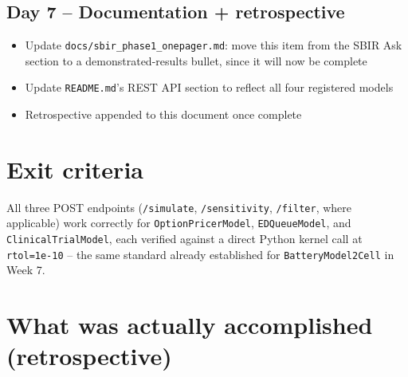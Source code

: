 \documentclass[11pt]{article}
\begin{document}
\subsection*{Day 7 -- Documentation + retrospective}
\begin{itemize}[leftmargin=*]
  \item Update \texttt{docs/sbir\_phase1\_onepager.md}: move this item
    from the SBIR Ask section to a demonstrated-results bullet, since
    it will now be complete
  \item Update \texttt{README.md}'s REST API section to reflect all
    four registered models
  \item Retrospective appended to this document once complete
\end{itemize}

\section*{Exit criteria}
All three POST endpoints (\texttt{/simulate}, \texttt{/sensitivity},
\texttt{/filter}, where applicable) work correctly for
\texttt{OptionPricerModel}, \texttt{EDQueueModel}, and
\texttt{ClinicalTrialModel}, each verified against a direct Python
kernel call at \texttt{rtol=1e-10} -- the same standard already
established for \texttt{BatteryModel2Cell} in Week 7.


\section*{What was actually accomplished (retrospective)}
\end{document}
